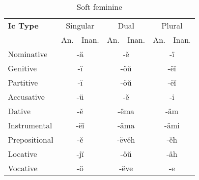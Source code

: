 \begin{table}
	\caption{Soft feminine}
	\begin{tabular}{lllllll}
		\textbf{Ic Type}       
		& \multicolumn{2}{c}{Singular} 
		& \multicolumn{2}{c}{Dual} 
		& \multicolumn{2}{c}{Plural} \\
		& An.   & Inan.  & An.   & Inan.   & An.  & Inan. \\
		Nominative    & \multicolumn{2}{c}{-ä}      
		& \multicolumn{2}{c}{-ě}        
		& \multicolumn{2}{c}{-ï} \\
		Genitive      & \multicolumn{2}{c}{-ï}       
		& \multicolumn{2}{c}{-öŭ}      
		& \multicolumn{2}{c}{-ëǐ}   \\
		Partitive     & \multicolumn{2}{c}{-ï}       
		& \multicolumn{2}{c}{-öŭ}      
		& \multicolumn{2}{c}{-ëǐ} \\
		Accusative    & \multicolumn{2}{c}{-ü}       
		& \multicolumn{2}{c}{-ě}
		& \multicolumn{2}{c}{-i} \\
		Dative        & \multicolumn{2}{c}{-ě}       
		& \multicolumn{2}{c}{-ëma}     
		& \multicolumn{2}{c}{-äm} \\
		Instrumental  & \multicolumn{2}{c}{-ëǐ}     
		& \multicolumn{2}{c}{-äma}     
		& \multicolumn{2}{c}{-ämi} \\
		Prepositional & \multicolumn{2}{c}{-ě}       
		& \multicolumn{2}{c}{-ëvěh}     
		& \multicolumn{2}{c}{-ěh} \\
		Locative      & \multicolumn{2}{c}{-jï}      
		& \multicolumn{2}{c}{-öŭ}       
		& \multicolumn{2}{c}{-äh} \\ 
		Vocative      & \multicolumn{2}{c}{-ö}       
		& \multicolumn{2}{c}{-ëve}      
		& \multicolumn{2}{c}{-e}
	\end{tabular}
\end{table}

